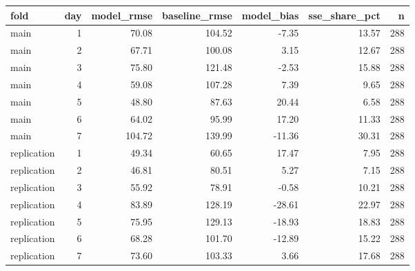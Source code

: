 \begin{tabular}{lrrrrrr}
\toprule
fold & day & model\_rmse & baseline\_rmse & model\_bias & sse\_share\_pct & n \\
\midrule
main & 1 & 70.08 & 104.52 & -7.35 & 13.57 & 288 \\
main & 2 & 67.71 & 100.08 & 3.15 & 12.67 & 288 \\
main & 3 & 75.80 & 121.48 & -2.53 & 15.88 & 288 \\
main & 4 & 59.08 & 107.28 & 7.39 & 9.65 & 288 \\
main & 5 & 48.80 & 87.63 & 20.44 & 6.58 & 288 \\
main & 6 & 64.02 & 95.99 & 17.20 & 11.33 & 288 \\
main & 7 & 104.72 & 139.99 & -11.36 & 30.31 & 288 \\
replication & 1 & 49.34 & 60.65 & 17.47 & 7.95 & 288 \\
replication & 2 & 46.81 & 80.51 & 5.27 & 7.15 & 288 \\
replication & 3 & 55.92 & 78.91 & -0.58 & 10.21 & 288 \\
replication & 4 & 83.89 & 128.19 & -28.61 & 22.97 & 288 \\
replication & 5 & 75.95 & 129.13 & -18.93 & 18.83 & 288 \\
replication & 6 & 68.28 & 101.70 & -12.89 & 15.22 & 288 \\
replication & 7 & 73.60 & 103.33 & 3.66 & 17.68 & 288 \\
\bottomrule
\end{tabular}
